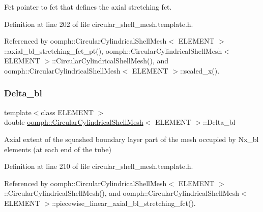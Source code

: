 Fct pointer to fct that defines the axial stretching fct. 



Definition at line 202 of file circular\+\_\+shell\+\_\+mesh.\+template.\+h.



Referenced by oomph\+::\+Circular\+Cylindrical\+Shell\+Mesh$<$ E\+L\+E\+M\+E\+N\+T $>$\+::axial\+\_\+bl\+\_\+stretching\+\_\+fct\+\_\+pt(), oomph\+::\+Circular\+Cylindrical\+Shell\+Mesh$<$ E\+L\+E\+M\+E\+N\+T $>$\+::\+Circular\+Cylindrical\+Shell\+Mesh(), and oomph\+::\+Circular\+Cylindrical\+Shell\+Mesh$<$ E\+L\+E\+M\+E\+N\+T $>$\+::scaled\+\_\+x().

\mbox{\label{classoomph_1_1CircularCylindricalShellMesh_a935925bc28901cf99f2ebdc2cff1b692}} 
\subsubsection{\texorpdfstring{Delta\+\_\+bl}{Delta\_bl}}
{\footnotesize\ttfamily template$<$class E\+L\+E\+M\+E\+NT $>$ \\
double \hyperlink{classoomph_1_1CircularCylindricalShellMesh}{oomph\+::\+Circular\+Cylindrical\+Shell\+Mesh}$<$ E\+L\+E\+M\+E\+NT $>$\+::Delta\+\_\+bl\hspace{0.3cm}{\ttfamily [private]}}



Axial extent of the squashed boundary layer part of the mesh occupied by Nx\+\_\+bl elements (at each end of the tube) 



Definition at line 210 of file circular\+\_\+shell\+\_\+mesh.\+template.\+h.



Referenced by oomph\+::\+Circular\+Cylindrical\+Shell\+Mesh$<$ E\+L\+E\+M\+E\+N\+T $>$\+::\+Circular\+Cylindrical\+Shell\+Mesh(), and oomph\+::\+Circular\+Cylindrical\+Shell\+Mesh$<$ E\+L\+E\+M\+E\+N\+T $>$\+::piecewise\+\_\+linear\+\_\+axial\+\_\+bl\+\_\+stretching\+\_\+fct().

\mbox{\label{classoomph_1_1CircularCylindricalShellMesh_a1a7ed3a5cd4c03c6254e5a8a0d3e532a}} 
